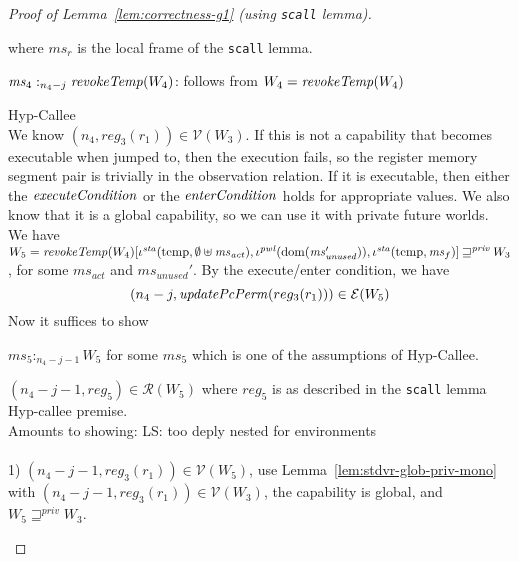 \documentclass[a4paper]{article}
\DeclareMathOperator{\dom}{dom}
\newcommand\lau[1]{{\color{purple} \sf \footnotesize {LS: #1}}\\}
\newcommand{\var}[1]{\mathit{#1}}
\newcommand{\hs}{\var{ms}}
\newcommand{\ms}{\hs}
\newcommand{\reg}{\var{reg}}
\newcommand{\heap}{\var{mem}}
\newcommand{\pwl}{\var{pwl}}
\newcommand{\sta}{\var{sta}}
\newcommand{\unused}{\var{unused}}
\newcommand{\act}{\var{act}}
\newcommand{\plainfun}[2]{
  \ifthenelse{\equal{#2}{}}
  {\mathit{#1}}
  {\mathit{#1}(#2)}
}
\newcommand{\updatePcPerm}[1]{\plainfun{updatePcPerm}{#1}}
\newcommand{\execCond}[1]{\plainfun{executeCondition}{#1}}
\newcommand{\entryCond}[1]{\plainfun{enterCondition}{#1}}
\newcommand{\revokeTemp}[1]{\plainfun{revokeTemp}{#1}}
\newcommand{\futurestr}{\mathbin{\sqsupseteq}^{\var{priv}}}
\newcommand{\heapSat}[3][\heap]{#1 :_{#2} #3}
\newcommand{\memSat}[3][n]{\heapSat[#2]{#1}{#3}}
\newcommand{\asmType}{\plaindom{AsmType}}
\newcommand{\plaindom}[1]{\mathrm{#1}}
\newcommand{\intr}[2]{\mathcal{#1}}
\newcommand{\valueintr}[1]{\intr{V}{#1}}
\newcommand{\exprintr}[1]{\intr{E}{#1}}
\newcommand{\regintr}[1]{\intr{R}{#1}}
\newcommand{\stdvr}{\valueintr{\asmType}}
\newcommand{\stder}{\exprintr{\asmType}}
\newcommand{\stdrr}{\regintr{\asmType}}
\newcommand{\npair}[2][n]{\left(#1,#2 \right)}
\newcommand{\plainview}[1]{\mathrm{#1}}
\newcommand{\temp}{\plainview{temp}}
\begin{document}
\begin{proof}[Proof of Lemma~\ref{lem:correctness-g1} (using \texttt{scall} lemma)]
\begin{enumproof}[resume]
\begin{enumproof}
\begin{enumproof}
\begin{enumproof}
                  where $\ms_r$ is the local frame of the \texttt{scall} lemma.
                  \begin{enumproof}
                    \item $\memSat[n_4-j]{\ms_4}{\revokeTemp{W_4}}$: follows from $W_4 = \revokeTemp{W_4}$
                    \item Hyp-Callee\\
                      We know $\npair[n_4]{\reg_3(r_1)} \in \stdvr(W_3)$. If this is not a capability that becomes executable when jumped to, then the execution fails, so the register memory segment pair is trivially in the observation relation. If it is executable, then either the $\execCond{}$ or the $\entryCond{}$ holds for appropriate values. We also know that it is a global capability, so we can use it with private future worlds. We have $W_5 = \revokeTemp{W_4}[\iota^\sta (\temp,\emptyset \uplus \ms_\act),\iota^\pwl(\dom(\ms_\unused')),\iota^\sta(\temp,\ms_f)] \futurestr W_3$, for some $\ms_\act$ and $\ms_\unused'$. By the execute/enter condition, we have
                      \[
                        \npair[n_4-j]{\updatePcPerm{reg_3(r_1)}} \in \stder(W_5)
                      \]
                      Now it suffices to show
                      \begin{enumproof}
                        \item $\memSat[n_4-j-1]{\ms_5}{W_5}$ for some $\ms_5$ which is one of the assumptions of Hyp-Callee.
                        \item $\npair[n_4-j-1]{\reg_5} \in \stdrr(W_5)$ where $\reg_5$ is as described in the \texttt{scall} lemma Hyp-callee premise.\\
                          Amounts to showing:\lau{too deply nested for environments}\\
                          1) $\npair[n_4-j-1]{\reg_3(r_1)} \in \stdvr(W_5)$, use Lemma~\ref{lem:stdvr-glob-priv-mono} with $\npair[n_4-j-1]{\reg_3(r_1)} \in \stdvr(W_3)$, the capability is global, and $W_5 \futurestr W_3$.


\end{enumproof}
\end{enumproof}
\end{enumproof}
\end{enumproof}
\end{enumproof}
\end{enumproof}
\end{proof}
\end{document}
